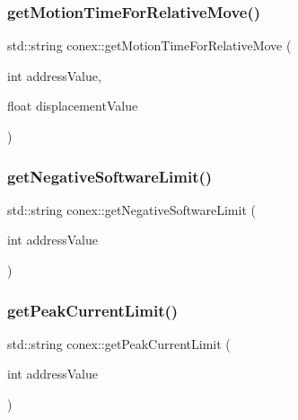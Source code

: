 \subsubsection{\texorpdfstring{get\+Motion\+Time\+For\+Relative\+Move()}{getMotionTimeForRelativeMove()}}
{\footnotesize\ttfamily std\+::string conex\+::get\+Motion\+Time\+For\+Relative\+Move (\begin{DoxyParamCaption}\item[{int}]{address\+Value,  }\item[{float}]{displacement\+Value }\end{DoxyParamCaption})}

\mbox{\label{namespaceconex_a90e63f39f299603adfbab034098ae702}} 
\subsubsection{\texorpdfstring{get\+Negative\+Software\+Limit()}{getNegativeSoftwareLimit()}}
{\footnotesize\ttfamily std\+::string conex\+::get\+Negative\+Software\+Limit (\begin{DoxyParamCaption}\item[{int}]{address\+Value }\end{DoxyParamCaption})}

\mbox{\label{namespaceconex_a4d69b5890ba99a072d3a3ef67f26047a}} 
\subsubsection{\texorpdfstring{get\+Peak\+Current\+Limit()}{getPeakCurrentLimit()}}
{\footnotesize\ttfamily std\+::string conex\+::get\+Peak\+Current\+Limit (\begin{DoxyParamCaption}\item[{int}]{address\+Value }\end{DoxyParamCaption})}

\mbox{\label{namespaceconex_ac78edbc8a18860189cd3963fb2b543f2}} 
